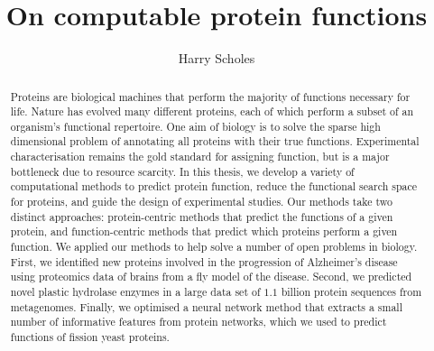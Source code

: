 


\title{On computable protein functions}
\author{Harry Scholes}

\maketitle

% 
\makedeclaration
% 

\cleardoublepage

\begin{abstract} %
    Proteins are biological machines that perform the majority of functions necessary for life. Nature has evolved many different proteins, each of which perform a subset of an organism’s functional repertoire. One aim of biology is to solve the sparse high dimensional problem of annotating all proteins with their true functions. Experimental characterisation remains the gold standard for assigning function, but is a major bottleneck due to resource scarcity. In this thesis, we develop a variety of computational methods to predict protein function, reduce the functional search space for proteins, and guide the design of experimental studies. Our methods take two distinct approaches: protein-centric methods that predict the functions of a given protein, and function-centric methods that predict which proteins perform a given function. We applied our methods to help solve a number of open problems in biology.
    First, we identified new proteins involved in the progression of Alzheimer’s disease using proteomics data of brains from a fly model of the disease.
    Second, we predicted novel plastic hydrolase enzymes in a large data set of $1.1$ billion protein sequences from metagenomes. Finally, we optimised a neural network method that extracts a small number of informative features from protein networks, which we used to predict functions of fission yeast proteins.
\end{abstract}

